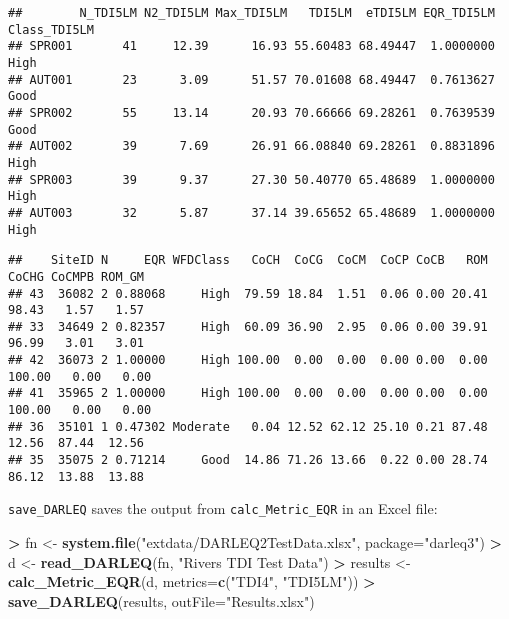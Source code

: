 \documentclass[
]{article}
\newenvironment{Shaded}{\begin{snugshade}}{\end{snugshade}}
\newcommand{\DataTypeTok}[1]{\textcolor[rgb]{0.13,0.29,0.53}{#1}}
\newcommand{\KeywordTok}[1]{\textcolor[rgb]{0.13,0.29,0.53}{\textbf{#1}}}
\newcommand{\NormalTok}[1]{#1}
\newcommand{\OperatorTok}[1]{\textcolor[rgb]{0.81,0.36,0.00}{\textbf{#1}}}
\newcommand{\StringTok}[1]{\textcolor[rgb]{0.31,0.60,0.02}{#1}}
\begin{document}
\begin{verbatim}
##        N_TDI5LM N2_TDI5LM Max_TDI5LM   TDI5LM  eTDI5LM EQR_TDI5LM Class_TDI5LM
## SPR001       41     12.39      16.93 55.60483 68.49447  1.0000000         High
## AUT001       23      3.09      51.57 70.01608 68.49447  0.7613627         Good
## SPR002       55     13.14      20.93 70.66666 69.28261  0.7639539         Good
## AUT002       39      7.69      26.91 66.08840 69.28261  0.8831896         High
## SPR003       39      9.37      27.30 50.40770 65.48689  1.0000000         High
## AUT003       32      5.87      37.14 39.65652 65.48689  1.0000000         High
\end{verbatim}

\begin{Shaded}
\end{Shaded}

\begin{verbatim}
##    SiteID N     EQR WFDClass   CoCH  CoCG  CoCM  CoCP CoCB   ROM  CoCHG CoCMPB ROM_GM
## 43  36082 2 0.88068     High  79.59 18.84  1.51  0.06 0.00 20.41  98.43   1.57   1.57
## 33  34649 2 0.82357     High  60.09 36.90  2.95  0.06 0.00 39.91  96.99   3.01   3.01
## 42  36073 2 1.00000     High 100.00  0.00  0.00  0.00 0.00  0.00 100.00   0.00   0.00
## 41  35965 2 1.00000     High 100.00  0.00  0.00  0.00 0.00  0.00 100.00   0.00   0.00
## 36  35101 1 0.47302 Moderate   0.04 12.52 62.12 25.10 0.21 87.48  12.56  87.44  12.56
## 35  35075 2 0.71214     Good  14.86 71.26 13.66  0.22 0.00 28.74  86.12  13.88  13.88
\end{verbatim}

\texttt{save\_DARLEQ} saves the output from \texttt{calc\_Metric\_EQR}
in an Excel file:

\begin{Shaded}
\begin{Highlighting}[]
\OperatorTok{>}\StringTok{ }\NormalTok{fn <-}\StringTok{ }\KeywordTok{system.file}\NormalTok{(}\StringTok{"extdata/DARLEQ2TestData.xlsx"}\NormalTok{, }\DataTypeTok{package=}\StringTok{"darleq3"}\NormalTok{)}
\OperatorTok{>}\StringTok{ }\NormalTok{d <-}\StringTok{ }\KeywordTok{read_DARLEQ}\NormalTok{(fn, }\StringTok{"Rivers TDI Test Data"}\NormalTok{)}
\OperatorTok{>}\StringTok{ }\NormalTok{results <-}\StringTok{ }\KeywordTok{calc_Metric_EQR}\NormalTok{(d, }\DataTypeTok{metrics=}\KeywordTok{c}\NormalTok{(}\StringTok{"TDI4"}\NormalTok{, }\StringTok{"TDI5LM"}\NormalTok{))}
\OperatorTok{>}\StringTok{ }\KeywordTok{save_DARLEQ}\NormalTok{(results, }\DataTypeTok{outFile=}\StringTok{"Results.xlsx"}\NormalTok{)}
\end{Highlighting}
\end{Shaded}
\end{document}
